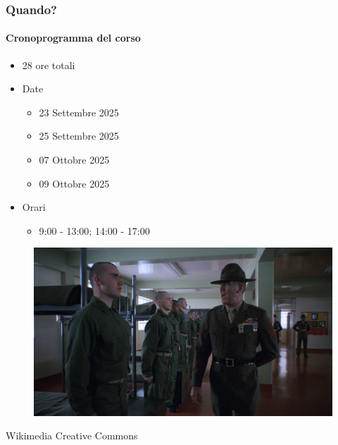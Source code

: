 \begin{frame}[t] \frametitle{Quando?}
\framesubtitle{Cronoprogramma del corso}
    \begin{itemize}[leftmargin=10pt,align=right]
        \item[\alert{\faHandORight}] 28 ore totali
        \item[\alert{\faHandORight}] Date
        \begin{itemize}[leftmargin=10pt,align=right]
            \item[\alert{\faHandORight}] 23 Settembre 2025
            \item[\alert{\faHandORight}] 25 Settembre 2025
            \item[\alert{\faHandORight}] 07 Ottobre 2025
            \item[\alert{\faHandORight}] 09 Ottobre 2025
        \end{itemize}
        \item[\alert{\faHandORight}] Orari
        \begin{itemize}[leftmargin=10pt,align=right]
            \item[\alert{\faHandORight}] 9:00 - 13:00; 14:00 - 17:00
        \end{itemize}         
    \end{itemize}
    \begin{center}
        \begin{minipage}[b]{.45\textwidth}
		    \begin{figure}[ht]
			    \includegraphics[width=\textwidth]{img/full-metal-jacket.jpg}
		    \end{figure}
            \begin{flushright}
                \vspace*{-10pt}
                {\tiny\textcopyright Wikimedia Creative Commons}
            \end{flushright}
	    \end{minipage}
    \end{center}
\end{frame}

